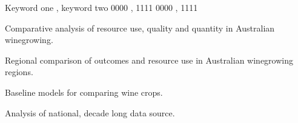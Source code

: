 \documentclass[review,12pt,authoryear]{elsarticle}
\begin{document}
\begin{linenumbers}
\begin{frontmatter}
\begin{keyword}
Keyword one \sep{} keyword two
\PACS{} 0000 \sep{} 1111
\MSC{} 0000 \sep{} 1111
\end{keyword}
\begin{highlights}
  \item Comparative analysis of resource use, quality and quantity in Australian winegrowing.
  \item Regional comparison of outcomes and resource use in Australian winegrowing regions.
  \item Baseline models for comparing wine crops.
  \item Analysis of national, decade long data source.
\end{highlights}
\end{frontmatter}



\end{linenumbers}
\end{document}

